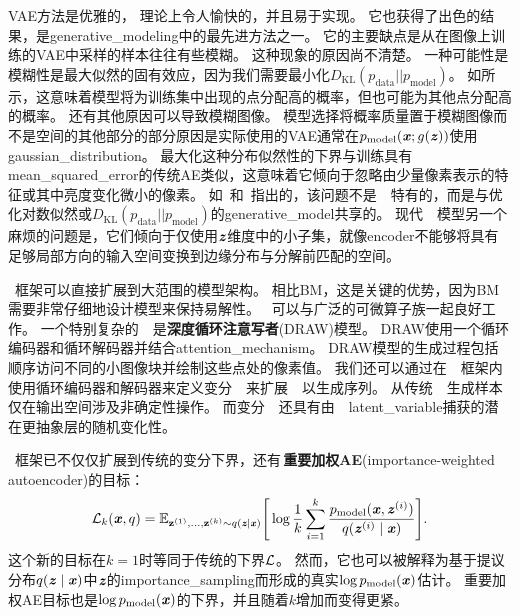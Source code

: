\gls{VAE}方法是优雅的， 理论上令人愉快的，并且易于实现。
它也获得了出色的结果，是\gls{generative_modeling}中的最先进方法之一。
它的主要缺点是从在图像上训练的\gls{VAE}中采样的样本往往有些模糊。
这种现象的原因尚不清楚。
一种可能性是模糊性是最大似然的固有效应，因为我们需要最小化$D_{\text{KL}}(p_{\text{data}} ||p_{\text{model}} )$。
如所示，这意味着模型将为训练集中出现的点分配高的概率，但也可能为其他点分配高的概率。
还有其他原因可以导致模糊图像。
模型选择将概率质量置于模糊图像而不是空间的其他部分的部分原因是实际使用的\gls{VAE}通常在$p_{\text{model}}(\boldsymbol{\mathit{x}}; g(\boldsymbol{\mathit{z}}))$使用\gls{gaussian_distribution}。
最大化这种分布似然性的下界与训练具有\gls{mean_squared_error}的传统\gls{AE}类似，这意味着它倾向于忽略由少量像素表示的特征或其中亮度变化微小的像素。
如~\citet{Theis2015d}和~\citet{Huszar-arXiv2015}指出的，该问题不是~~特有的，而是与优化对数似然或$D_{\text{KL}}(p_{\text{data}} ||p_{\text{model}} )$的\gls{generative_model}共享的。
现代~~模型另一个麻烦的问题是，它们倾向于仅使用$\boldsymbol{\mathit{z}}$维度中的小子集，就像\gls{encoder}不能够将具有足够局部方向的输入空间变换到边缘分布与分解前匹配的空间。


~框架可以直接扩展到大范围的模型架构。
相比\gls{BM}，这是关键的优势，因为\gls{BM}需要非常仔细地设计模型来保持易解性。
~可以与广泛的可微算子族一起良好工作。
一个特别复杂的~~是\textbf{深度循环注意写者}(DRAW)模型\citep{Gregor2015}。
DRAW使用一个循环编码器和循环解码器并结合\gls{attention_mechanism}。
DRAW模型的生成过程包括顺序访问不同的小图像块并绘制这些点处的像素值。
我们还可以通过在~~框架内使用循环编码器和解码器来定义变分~~\citep{Chung-et-al-NIPS2015}来扩展~~以生成序列。
从传统~~生成样本仅在输出空间涉及非确定性操作。
而变分~~还具有由~~\gls{latent_variable}捕获的潜在更抽象层的随机变化性。


~框架已不仅仅扩展到传统的变分下界，还有\,\textbf{重要加权\gls{AE}}(importance-weighted autoencoder)\citep{burda2015importance}的目标：
\begin{align}
 \mathcal{L}_k(\boldsymbol{\mathit{x}}, q) = \mathbb{E}_{\mathbf{z}^{(1)},\dots,\mathbf{z}^{(k)} \sim q(\boldsymbol{\mathit{z}}  \mid  \boldsymbol{\mathit{x}})}
 \Bigg[ \log \frac{1}{k} \sum_{i=1}^k 
 \frac{p_{\text{model}}(\boldsymbol{\mathit{x}}, \boldsymbol{\mathit{z}}^{(i)})}{q(\boldsymbol{\mathit{z}}^{(i)}  \mid  \boldsymbol{\mathit{x}})} \Bigg].
\end{align}
这个新的目标在$k=1$时等同于传统的下界$\mathcal{L}$。
然而，它也可以被解释为基于提议分布$q(\boldsymbol{\mathit{z}}  \mid  \boldsymbol{\mathit{x}})$中$\boldsymbol{\mathit{z}}$的\gls{importance_sampling}而形成的真实$\log p_{\text{model}}(\boldsymbol{\mathit{x}})$估计。
重要加权\gls{AE}目标也是$\log p_{\text{model}}(\boldsymbol{\mathit{x}})$的下界，并且随着$k$增加而变得更紧。


